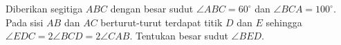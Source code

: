 Diberikan segitiga $ABC$ dengan besar sudut $\angle ABC = 60^\circ$ dan $\angle BCA = 100^\circ$. Pada sisi $AB$ dan $AC$ berturut-turut terdapat titik $D$ dan $E$ sehingga $\angle EDC = 2\angle BCD = 2\angle CAB$. Tentukan besar sudut $\angle BED$.